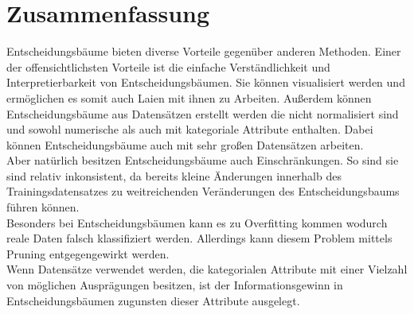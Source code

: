\chapter{Zusammenfassung}
\label{zusammenfassung}

Entscheidungsbäume bieten diverse Vorteile gegenüber anderen Methoden. Einer der offensichtlichsten Vorteile ist die einfache Verständlichkeit und Interpretierbarkeit von Entscheidungsbäumen. \autocite{DataMining} Sie können visualisiert werden und ermöglichen es somit auch Laien mit ihnen zu Arbeiten. \autocite{PythonCourseDecisionTrees:online} Außerdem können Entscheidungsbäume aus Datensätzen erstellt werden die nicht normalisiert sind und sowohl numerische als auch mit kategoriale Attribute enthalten. Dabei können Entscheidungsbäume auch mit sehr großen Datensätzen arbeiten. \autocite{PythonCourseDecisionTrees:online}\\

Aber natürlich besitzen Entscheidungsbäume auch Einschränkungen. So sind sie sind relativ inkonsistent, da bereits kleine Änderungen innerhalb des Trainingsdatensatzes zu weitreichenden Veränderungen des Entscheidungsbaums führen können. \autocite{PythonCourseDecisionTrees:online}\\
Besonders bei Entscheidungsbäumen kann es zu Overfitting kommen wodurch reale Daten falsch klassifiziert werden. Allerdings kann diesem Problem mittels Pruning entgegengewirkt werden. \autocite{DataMining}\\
Wenn Datensätze verwendet werden, die kategorialen Attribute mit einer Vielzahl von möglichen Ausprägungen besitzen, ist der Informationsgewinn in Entscheidungsbäumen zugunsten dieser Attribute ausgelegt.\autocite{PythonCourseDecisionTrees:online}